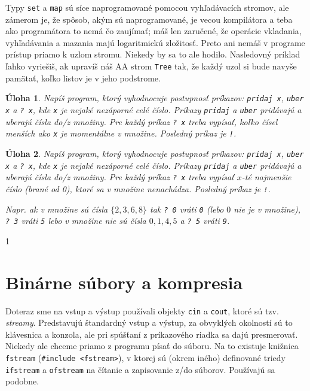 \documentclass[10pt]{article}
\def\prg{\lstinline}
\def\ods{\vspace*{10pt}}
\newtheorem{uloha}{Úloha}
\def\sectxxvi{1} %
\def\sectxxvi{0} %
\begin{document}
{\ods
Typy \prg!set! a \prg!map! sú síce naprogramované pomocou vyhľadávacích stromov, ale zámerom
je, že spôsob, akým sú naprogramované, je vecou kompilátora a teba ako programátora
to nemá čo zaujímať; máš len zaručené, že operácie vkladania, vyhľadávania a mazania
majú logaritmickú zložitosť. Preto ani nemáš v programe prístup priamo k uzlom stromu.
Niekedy by sa to ale hodilo. Nasledovný príklad ľahko vyriešiš, ak upravíš náš
AA strom \prg!Tree! tak, že každý uzol si bude navyše pamätať, 
koľko listov je v jeho podstrome.

\begin{uloha}
  Napíš program, ktorý vyhodnocuje postupnosť príkazov: {\tt pridaj x}, {\tt uber x}
  a {\tt ? x}, kde {\tt x} je nejaké nezáporné celé číslo. Príkazy {\tt pridaj} a {\tt uber}
  pridávajú a uberajú čísla do/z množiny. 
  Pre každý príkaz {\tt ? x} treba vypísať, koľko čísel 
  menších ako {\tt x} je momentálne v množine.
  Posledný príkaz je {\tt !}.
\end{uloha}

\begin{uloha}
  Napíš program, ktorý vyhodnocuje postupnosť príkazov: {\tt pridaj x}, {\tt uber x}
  a {\tt ? x}, kde {\tt x} je nejaké nezáporné celé číslo. Príkazy {\tt pridaj} a {\tt uber}
  pridávajú a uberajú čísla do/z množiny. 
  Pre každý príkaz {\tt ? x} treba vypísať $x$-té najmenšie číslo (brané od 0), ktoré
  sa v množine nenachádza.
  Posledný príkaz je {\tt !}.

  \ods
  Napr. ak v množine sú čísla $\{2,3,6,8\}$ tak {\tt ? 0} vráti {\tt 0} (lebo $0$ nie
  je v množine), {\tt ? 3} vráti {\tt 5}
  lebo v množine nie sú čísla $0,1,4,5$ a {\tt ? 5} vráti {\tt 9}.
\end{uloha}

\fi

\if\sectxxvi1
\section{Binárne súbory a kompresia}

Doteraz sme na vstup a výstup používali objekty {\tt cin} a {\tt cout}, ktoré
sú tzv. {\em streamy}. Predstavujú štandardný vstup a výstup, za obvyklých
okolností sú to klávesnica a konzola, ale pri spúšťaní z príkazového riadka sa dajú 
presmerovať. Niekedy ale chceme priamo z programu písať do súboru. Na to existuje
knižnica \prg!fstream! (\prg!#include <fstream>!), v ktorej sú (okrem iného) definované
triedy \prg!ifstream! a \prg!ofstream! na čítanie a zapisovanie z/do súborov. Používajú
sa podobne. 

}
\end{document}
